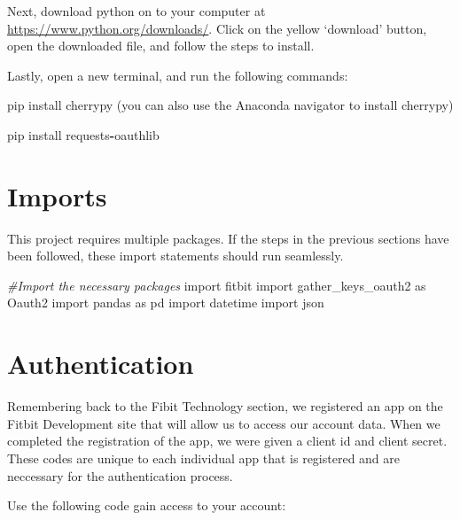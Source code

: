 \documentclass[]{book}
\newenvironment{Shaded}{\begin{snugshade}}{\end{snugshade}}
\newcommand{\ImportTok}[1]{#1}
\newcommand{\CommentTok}[1]{\textcolor[rgb]{0.56,0.35,0.01}{\textit{#1}}}
\newcommand{\OperatorTok}[1]{\textcolor[rgb]{0.81,0.36,0.00}{\textbf{#1}}}
\newcommand{\NormalTok}[1]{#1}
\begin{document}
Next, download python on to your computer at
\url{https://www.python.org/downloads/}. Click on the yellow `download'
button, open the downloaded file, and follow the steps to install.

Lastly, open a new terminal, and run the following commands:

\begin{Shaded}
\begin{Highlighting}[]
\NormalTok{pip install cherrypy (you can also use the Anaconda navigator to install cherrypy)}

\NormalTok{pip install requests}\OperatorTok{-}\NormalTok{oauthlib  }
\end{Highlighting}
\end{Shaded}

\section{Imports}\label{imports}

This project requires multiple packages. If the steps in the previous
sections have been followed, these import statements should run
seamlessly.

\begin{Shaded}
\begin{Highlighting}[]
\CommentTok{#Import the necessary packages}
\ImportTok{import}\NormalTok{ fitbit}
\ImportTok{import}\NormalTok{ gather_keys_oauth2 }\ImportTok{as}\NormalTok{ Oauth2}
\ImportTok{import}\NormalTok{ pandas }\ImportTok{as}\NormalTok{ pd }
\ImportTok{import}\NormalTok{ datetime}
\ImportTok{import}\NormalTok{ json}
\end{Highlighting}
\end{Shaded}

\section{Authentication}\label{authentication}

Remembering back to the Fibit Technology section, we registered an app
on the Fitbit Development site that will allow us to access our account
data. When we completed the registration of the app, we were given a
client id and client secret. These codes are unique to each individual
app that is registered and are neccessary for the authentication
process.

Use the following code gain access to your account:
\end{document}
